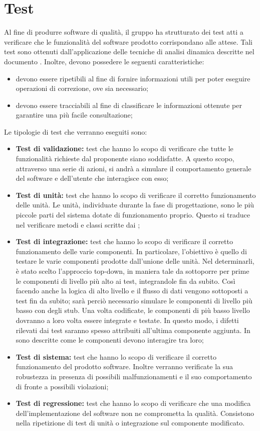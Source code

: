 \documentclass[PianoDiQualifica.tex]{subfiles}
\begin{document}
\section{Test}
Al fine di produrre software di qualità, il gruppo ha strutturato dei test atti a verificare che le funzionalità del software prodotto corrispondano alle attese.
Tali test sono ottenuti dall'applicazione delle tecniche di analisi dinamica descritte nel documento \NPdocRP{}. Inoltre, devono possedere le seguenti caratteristiche:
\begin{itemize}
	\item devono essere ripetibili al fine di fornire informazioni utili per poter eseguire operazioni di correzione, ove sia necessario;
	\item devono essere tracciabili al fine di classificare le informazioni ottenute per garantire una più facile consultazione;
\end{itemize}
Le tipologie di test che verranno eseguiti sono:
\begin{itemize}
\item \textbf{Test di validazione:} test che hanno lo scopo di verificare che tutte le funzionalità richieste dal proponente siano soddisfatte. A questo scopo, attraverso una serie di
azioni, si andrà a simulare il comportamento generale del software e dell'utente che interagisce con esso;
\item \textbf{Test di unità: } test che  hanno lo scopo di verificare il corretto funzionamento delle unità. Le unità, individuate durante la fase di progettazione, sono le
		più piccole parti del sistema dotate di funzionamento proprio. Questo si traduce nel verificare metodi e classi scritte dai \PRP{};
\item \textbf{Test di integrazione: } test che hanno lo scopo di verificare il corretto funzionamento delle varie componenti. In particolare, l'obiettivo è quello di testare le varie componenti prodotte dall'unione delle unità. Nel determinarli, è stato scelto l'approccio top-down, in maniera tale da sottoporre per prime le componenti di livello più alto ai test, integrandole fin da subito. Così facendo anche la logica di alto livello e il flusso di dati vengono sottoposti a test fin da subito; sarà perciò necessario simulare le componenti di livello più basso con degli stub. Una volta codificate, le componenti di più basso livello dovranno a loro volta essere
integrate e testate. In questo modo, i difetti rilevati dai test saranno spesso attribuiti all'ultima componente aggiunta. In \DPdoc{} sono descritte come le componenti devono interagire tra loro;
\item \textbf{Test di sistema: }test che hanno lo scopo di verificare il corretto funzionamento del prodotto software. Inoltre verranno verificate la sua robustezza in presenza di
		possibili malfunzionamenti e il suo comportamento di fronte a possibili violazioni;
\item \textbf{Test di regressione: } test che hanno lo scopo di verificare che una modifica dell'implementazione del software non ne comprometta la qualità. Consistono nella ripetizione di test di unità o integrazione sul componente modificato.			
\end{itemize}
\end{document}
